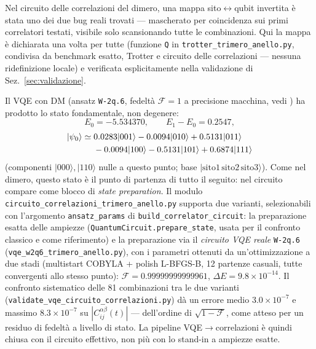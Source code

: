 \documentclass[11pt,a4paper]{article}
\newcommand{\ket}[1]{\lvert #1\rangle}
\begin{document}
\begin{warnbox}
Nel circuito delle correlazioni del dimero, una mappa sito$\leftrightarrow$qubit invertita è
stata uno dei due bug reali trovati --- mascherato per coincidenza sui primi correlatori
testati, visibile solo scansionando tutte le combinazioni. Qui la mappa è dichiarata una volta
per tutte (funzione \texttt{Q} in \texttt{trotter\_trimero\_anello.py}, condivisa da benchmark
esatto, Trotter e circuito delle correlazioni --- nessuna ridefinizione locale) e verificata
esplicitamente nella validazione di Sez.~\ref{sec:validazione}.
\end{warnbox}

Il VQE con DM (ansatz \texttt{W-2q.6}, fedeltà $\mathcal F=1$ a precisione macchina, vedi
\texttt{}) ha prodotto lo stato fondamentale, non degenere:
\begin{equation}
E_0=-5.534370,\qquad E_1-E_0=0.2547,
\end{equation}
\begin{align}
\ket{\psi_0}\simeq{}& 0.0283\ket{001}-0.0094\ket{010}+0.5131\ket{011} \notag\\
&-0.0094\ket{100}-0.5131\ket{101}+0.6874\ket{111}
\end{align}
(componenti $\ket{000},\ket{110}$ nulle a questo punto; base $\ket{\text{sito}1\,\text{sito}2\,\text{sito}3}$).
Come nel dimero, questo stato è il punto di partenza di tutto il seguito: nel circuito compare
come blocco di \emph{state preparation}. Il modulo \texttt{circuito\_correlazioni\_trimero\_anello.py}
supporta due varianti, selezionabili con l'argomento \texttt{ansatz\_params} di
\texttt{build\_correlator\_circuit}: la preparazione esatta delle ampiezze
(\texttt{QuantumCircuit.prepare\_state}, usata per il confronto classico e come riferimento) e la
preparazione via il \emph{circuito VQE reale} \texttt{W-2q.6} (\texttt{vqe\_w2q6\_trimero\_anello.py}),
con i parametri ottenuti da un'ottimizzazione a due stadi (multistart COBYLA + polish L-BFGS-B,
12 partenze casuali, tutte convergenti allo stesso punto): $\mathcal F=0.99999999999961$,
$\Delta E=9.8\times10^{-14}$. Il confronto sistematico delle 81 combinazioni tra le due varianti
(\texttt{validate\_vqe\_circuito\_correlazioni.py}) dà un errore medio $3.0\times10^{-7}$ e massimo
$8.3\times10^{-7}$ su $|C_{ij}^{\alpha\beta}(t)|$ --- dell'ordine di $\sqrt{1-\mathcal F}$, come atteso
per un residuo di fedeltà a livello di stato. La pipeline VQE$\to$correlazioni è quindi chiusa con il
circuito effettivo, non più con lo stand-in a ampiezze esatte.
\end{document}
